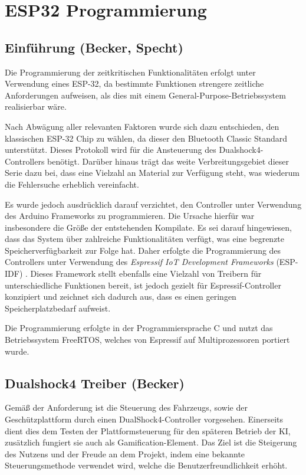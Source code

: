 \chapter{ESP32 Programmierung}

\section{Einführung (Becker, Specht)}

Die Programmierung der zeitkritischen Funktionalitäten erfolgt unter Verwendung eines \mbox{ESP-32}, da bestimmte Funktionen strengere zeitliche Anforderungen aufweisen, als dies mit einem General-Purpose-Betriebssystem realisierbar wäre.

Nach Abwägung aller relevanten Faktoren wurde sich dazu entschieden, den klassischen \mbox{ESP-32} Chip zu wählen, da dieser den Bluetooth Classic Standard unterstützt. 
Dieses Protokoll wird für die Ansteuerung des Dualshock4-Controllers benötigt.
Darüber hinaus trägt das weite Verbreitungsgebiet dieser Serie dazu bei, dass eine Vielzahl an Material zur Verfügung steht, was wiederum die Fehlersuche erheblich vereinfacht.

Es wurde jedoch ausdrücklich darauf verzichtet, den Controller unter Verwendung des Arduino Frameworks zu programmieren. 
Die Ursache hierfür war insbesondere die Größe der entstehenden Kompilate. 
Es sei darauf hingewiesen, dass das System über zahlreiche Funktionalitäten verfügt, was eine begrenzte Speicherverfügbarkeit zur Folge hat. 
Daher erfolgte die Programmierung des Controllers unter Verwendung des \textit{Espressif IoT Development Frameworks} (ESP-IDF) \cite{esp_esp_idf}. 
Dieses Framework stellt ebenfalls eine Vielzahl von Treibern für unterschiedliche Funktionen bereit, ist jedoch gezielt für Espressif-Controller konzipiert und zeichnet sich dadurch aus, dass es einen geringen Speicherplatzbedarf aufweist. 

Die Programmierung erfolgte in der Programmiersprache C und nutzt das Betriebssystem FreeRTOS, welches von Espressif auf Multiprozessoren portiert wurde.

\section{Dualshock4 Treiber (Becker)}

Gemäß der Anforderung ist die Steuerung des Fahrzeugs, sowie der Geschützplattform durch einen DualShock4-Controller vorgesehen. 
Einerseits dient dies dem Testen der Plattformsteuerung für den späteren Betrieb der KI, zusätzlich fungiert sie auch als Gamification-Element. 
Das Ziel ist die Steigerung des Nutzens und der Freude an dem Projekt, indem eine bekannte Steuerungsmethode verwendet wird, welche die Benutzerfreundlichkeit erhöht.

